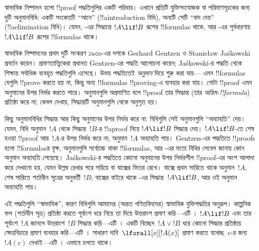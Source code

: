 \documentclass[../../../include/open-logic-section]{subfiles}
\begin{document}


স্বাভাবিক নিষ্পাদন হলো !!{proof} পদ্ধতিগুলির একটি পরিবার।
এখানে প্রতিটি যুক্তিসংযোজক বা পরিমাণসূচকের জন্য দুটি অনুমানবিধি:
একটি সংকেতটি ``আনে'' (!!a{introduction} বিধি), অন্যটি
সেটি ``বাদ দেয়'' (!!a{elimination} বিধি)। যেমন,
\Intro{\lif}-এর সিদ্ধান্তে $!A \lif !B$ রূপের !!{formula}s
থাকে, আর \Elim{\lif}-এর পূর্বধারণায় $!A \lif !B$
রূপের !!{formula}s থাকে।

স্বাভাবিক নিষ্পাদনের প্রথম দুটি সংস্করণ ১৯৩০-এর দশকে
Gerhard Gentzen ও Stanisław Jaśkowski প্রবর্তন করেন।
প্রমাণতাত্ত্বিকেরা প্রধানত Gentzen-এর পদ্ধতি আলোচনা করেন;
Jaśkowski-র পদ্ধতি থেকে শিক্ষায় সর্বাধিক ব্যবহৃত পদ্ধতিগুলি
এসেছে। উভয় পদ্ধতিতেই \emph{অনুমান} দিয়ে শুরু করা যায়—
এমন !!{formula}s যেগুলি !!{prove} করতে হয় না, কিন্তু
অন্য !!{formula}s !!{proving}-এ ব্যবহার করা যায়। গোটা
!!{proof} এমন অনুমানের উপর নির্ভর করতে পারে। অনুমানগুলি
অপ্রমাণিত বলে !!{proof} তার সিদ্ধান্ত (তার
\emph{অন্তিম-!!{formula}}) প্রতিষ্ঠা করে না; কেবল দেখায়,
সিদ্ধান্তটি অনুমানগুলি থেকে অনুসৃত হয়।

কিছু অনুমানবিধির সিদ্ধান্ত আর কিছু অনুমানের উপর নির্ভর করে
না: বিধিগুলি সেই অনুমানগুলি ``অব্যাহতি'' দেয়। যেমন,
\Intro{\lif} বিধি অনুমান~$!A$ থেকে সিদ্ধান্ত~$!B$-র
!!a{proof} নিয়ে $!A \lif !B$ সিদ্ধান্ত দেয়।
$!A \lif !B$-তে শেষ হওয়া !!{proof} আর~$!A$-র
উপর নির্ভর করে না; অনুমান~$!A$ অব্যাহতি পায়।
Gentzen-এর পদ্ধতিতে !!{proof}s হলো !!{formula}sর
বৃক্ষ, অনুমানগুলি সর্বোচ্চে থাকা !!{formula}s, আর
\Intro{\lif}-এর মতো বিধির লেবেল জানায় কোন অনুমান
অব্যাহতি পেয়েছে। Jaśkowski-র পদ্ধতিতে কোনো অনুমানের
উপর নির্ভরশীল !!{proof}-এর অংশ আলাদা করে দেখানো হয়,
যেমন উল্লম্ব রেখার পরে সরিয়ে বা বাক্সের ভিতর রেখে। বাক্সে
প্রথম সারিতে থাকে অনুমান~$!A$, শেষ সারিতে শর্তাধীন
সূত্রের অনুবর্তী~$!B$; বাক্সের বাইরে থাকে
\Intro{\lif}-এর সিদ্ধান্ত~$!A \lif !B$, আর ওই অনুমান
অব্যাহতি পায়।

এই পদ্ধতিগুলি ``স্বাভাবিক'', কারণ বিধিগুলি আমাদের
(অন্তত গণিতবিদদের) স্বাভাবিক যুক্তিপদ্ধতির অনুরূপ।
কাল্পনিক ফল (শর্তাধীন সূত্র) প্রতিষ্ঠা করতে পূর্বাংশ
ধরে নিয়ে তা দিয়ে উত্তরাংশ প্রমাণ করি—এটি
\Intro{\lif}। $!A \lif !B$ এবং তার পূর্বাংশ~$!A$
জানলে উত্তরাংশ~$!B$ সিদ্ধান্ত করি—এটি \Elim{\lif}।
একটি বিচ্ছেদ~$!A \lor !B$ ধরে কোনো সিদ্ধান্ত প্রতিষ্ঠায়
ক্ষেত্রবিচারে প্রমাণ ব্যবহার করি—এটি \Elim{\lor}।
সাধারণ দাবি~$\lforall[x][!A(x)]$ প্রমাণ করতে যথেচ্ছ~$c$-র
জন্য $!A(c)$ দেখাই—এটি \Intro{\lforall}। এভাবে চলতে থাকে।
\end{document}
